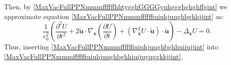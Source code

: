 \documentclass{article}
\theoremstyle{definition}
\theoremstyle{remark}
\renewcommand{\vec}[1]{\mathbf{#1}}
\newcommand{\er}{\eqref}
\newcommand{\er}{\eqref}
\begin{document}
Then, by \er{MaxVacFullPPNmmmffffffhhtygghGGGGyuhggghghghffgint} we
approximate equation \er{MaxVacFullPPNmmmffffffiuiuhjuughbghhjjint}
as:
\begin{equation}\label{MaxVacFullPPNmmmffffffiuiuhjuughbghhiuijuyuggkkjjint}
\frac{1}{c^2_0}\left(\frac{\partial^2 U}{\partial t^2}+2\vec {\tilde
u}\cdot\nabla_{\vec x}\left(\frac{\partial U}{\partial
t}\right)+\left(\nabla^2_{\vec x}U\cdot\vec {\tilde
u}\right)\cdot\vec {\tilde u}\right)-\Delta_{\vec x}U=0.
\end{equation}
Thus, inserting \er{MaxVacFullPPNmmmffffffiuiuhjuughbghhuiiujjint}
into \er{MaxVacFullPPNmmmffffffiuiuhjuughbghhiuijuyuggkkjjint},
%
%
%
\begin{comment}
we deduce:
\begin{multline}\label{MaxVacFullPPNmmmffffffiuiuhjuughbghhiuijjjint}
-\frac{k^2_0}{c^2_0}\left(\frac{\partial S}{\partial
t}\right)^2Ae^{ik_0S}+\frac{ik_0}{c^2_0}\left(\frac{\partial^2
S}{\partial t^2}\right)Ae^{ik_0S}+\frac{2ik_0}{c^2_0}\frac{\partial
A}{\partial t}\frac{\partial S}{\partial
t}e^{ik_0S}+\frac{1}{c^2_0}\frac{\partial^2 A}{\partial
t^2}e^{ik_0S}
\\-\frac{2k^2_0}{c^2_0}\frac{\partial S}{\partial
t}\left(\vec {\tilde u}\cdot\nabla_{\vec
x}S\right)Ae^{ik_0S}+\frac{2ik_0 }{c^2_0}\left(\vec {\tilde u}\cdot
\nabla_{\vec x}\left(\frac{\partial S}{\partial
t}\right)\right)Ae^{ik_0S}+\frac{2ik_0}{c^2_0}\left(\vec {\tilde
u}\cdot\nabla_{\vec x}A\right)\frac{\partial S}{\partial
t}e^{ik_0S}\\+\frac{2ik_0}{c^2_0}\left(\vec {\tilde
u}\cdot\nabla_{\vec x}S\right)\frac{\partial A}{\partial
t}e^{ik_0S}+\frac{2}{c^2_0}\vec {\tilde u}\cdot\nabla_{\vec
x}\left(\frac{\partial A}{\partial
t}\right)e^{ik_0S}-\frac{k^2_0}{c^2}\left|\vec {\tilde
u}\cdot\nabla_{\vec
x}S\right|^2Ae^{ik_0S}\\+\frac{ik_0}{c^2_0}\left(\left(\nabla^2_{\vec
x}S\cdot\vec {\tilde u}\right)\cdot\vec {\tilde
u}\right)Ae^{ik_0S}+\frac{2ik_0}{c^2_0}\left(\vec {\tilde
u}\cdot\nabla_{\vec x}A\right)\left(\vec {\tilde u}\cdot\nabla_{\vec
x}S\right)e^{ik_0S}+\frac{1}{c^2_0}\left(\left(\nabla^2_{\vec
x}A\cdot\vec {\tilde u}\right)\cdot\vec {\tilde
u}\right)e^{ik_0S}\\+k^2_0\left|\nabla_{\vec
x}S\right|^2Ae^{ik_0S}-ik_0\left(\Delta_{\vec
x}S\right)Ae^{ik_0S}-2ik_0\left(\nabla_{\vec x}A\cdot\nabla_{\vec
x}S\right)e^{ik_0S}-\left(\Delta_{\vec x}A\right)e^{ik_0S}=0.
\end{multline}

\end{comment}
\end{document}
